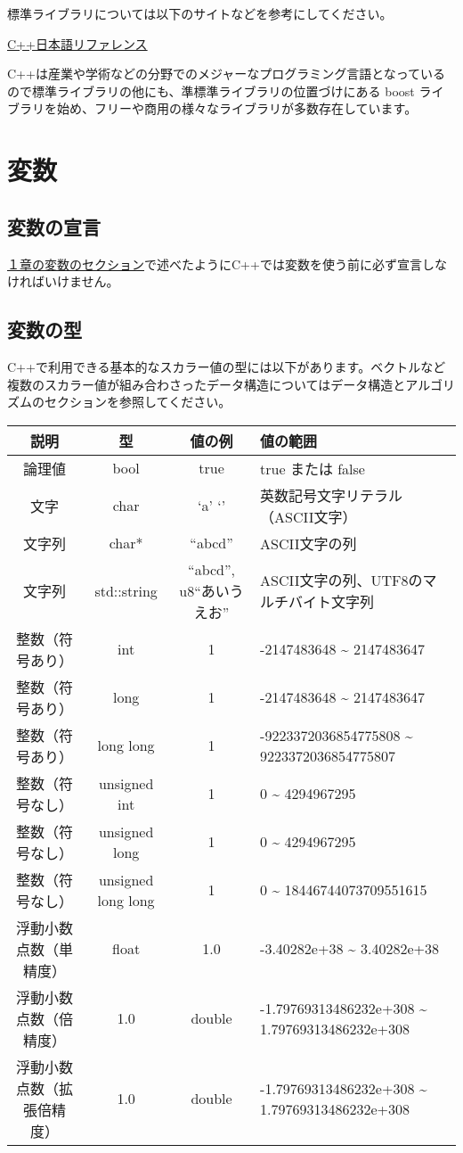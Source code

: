 \documentclass[]{book}
\begin{document}
標準ライブラリについては以下のサイトなどを参考にしてください。

\href{https://cpprefjp.github.io/reference.html}{C++日本語リファレンス}

C++は産業や学術などの分野でのメジャーなプログラミング言語となっているので標準ライブラリの他にも、準標準ライブラリの位置づけにある
boost
ライブラリを始め、フリーや商用の様々なライブラリが多数存在しています。

\chapter{変数}

\section{変数の宣言}

\href{010_outline.Rmd}{１章の変数のセクション}で述べたようにC++では変数を使う前に必ず宣言しなければいけません。

\section{変数の型}

C++で利用できる基本的なスカラー値の型には以下があります。ベクトルなど複数のスカラー値が組み合わさったデータ構造についてはデータ構造とアルゴリズムのセクションを参照してください。

\begin{longtable}[]{@{}cccl@{}}
\toprule
説明 & 型 & 値の例 & 値の範囲\tabularnewline
\midrule
\endhead
論理値 & bool & true & true または false\tabularnewline
文字 & char & `a' `\n' &
英数記号文字リテラル（ASCII文字）\tabularnewline
文字列 & char* & ``abcd\n'' & ASCII文字の列\tabularnewline
文字列 & std::string & ``abcd\n'', u8``あいうえお'' &
ASCII文字の列、UTF8のマルチバイト文字列\tabularnewline
整数（符号あり） & int & 1 & -2147483648 \textasciitilde{}
2147483647\tabularnewline
整数（符号あり） & long & 1 & -2147483648 \textasciitilde{}
2147483647\tabularnewline
整数（符号あり） & long long & 1 & -9223372036854775808
\textasciitilde{} 9223372036854775807\tabularnewline
整数（符号なし） & unsigned int & 1 & 0 \textasciitilde{}
4294967295\tabularnewline
整数（符号なし） & unsigned long & 1 & 0 \textasciitilde{}
4294967295\tabularnewline
整数（符号なし） & unsigned long long & 1 & 0 \textasciitilde{}
18446744073709551615\tabularnewline
浮動小数点数（単精度） & float & 1.0 & -3.40282e+38 \textasciitilde{}
3.40282e+38\tabularnewline
浮動小数点数（倍精度） & 1.0 & double & -1.79769313486232e+308
\textasciitilde{} 1.79769313486232e+308\tabularnewline
浮動小数点数（拡張倍精度） & 1.0 & double & -1.79769313486232e+308
\textasciitilde{} 1.79769313486232e+308\tabularnewline
\bottomrule
\end{longtable}
\end{document}
